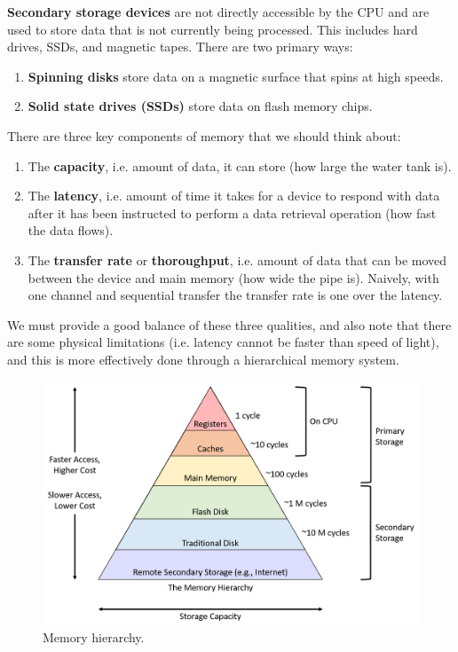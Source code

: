 \documentclass{article}
\begin{document}
    \begin{definition}
      \textbf{Secondary storage devices} are not directly accessible by the CPU and are used to store data that is not currently being processed. This includes hard drives, SSDs, and magnetic tapes. There are two primary ways: 
      \begin{enumerate}
        \item \textbf{Spinning disks} store data on a magnetic surface that spins at high speeds.
        \item \textbf{Solid state drives (SSDs)} store data on flash memory chips.
      \end{enumerate}
    \end{definition}

    There are three key components of memory that we should think about: 
    \begin{enumerate}
      \item The \textbf{capacity}, i.e. amount of data, it can store (how large the water tank is). 
      \item The \textbf{latency}, i.e. amount of time it takes for a device to respond with data after it has been instructed to perform a data retrieval operation (how fast the data flows). 
      \item The \textbf{transfer rate} or \textbf{thoroughput}, i.e. amount of data that can be moved between the device and main memory (how wide the pipe is). Naively, with one channel and sequential transfer the transfer rate is one over the latency. 
    \end{enumerate}

    We must provide a good balance of these three qualities, and also note that there are some physical limitations (i.e. latency cannot be faster than speed of light), and this is more effectively done through a hierarchical memory system.

    \begin{figure}[H]
      \centering 
      \includegraphics[scale=0.4]{img/memory_hierarchy.png}
      \caption{Memory hierarchy.} 
      \label{fig:memory_hierarchy}
    \end{figure}
\end{document}
